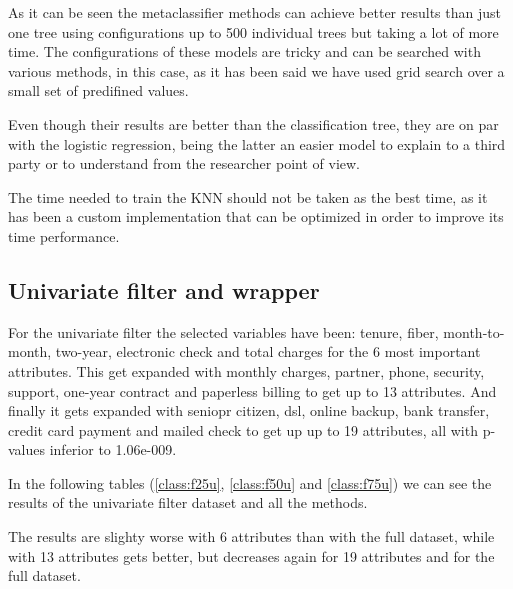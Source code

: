 \documentclass[a4paper,11pt]{article}
\begin{document}
As it can be seen the metaclassifier methods can achieve better results than just one tree using configurations up to 500 individual trees but taking a lot of more time. The configurations of these models are tricky and can be searched with various methods, in this case, as it has been said we have used grid search over a small set of predifined values.

Even though their results are better than the classification tree, they are on par with the logistic regression, being the latter an easier model to explain to a third party or to understand from the researcher point of view.

The time needed to train the KNN should not be taken as the best time, as it has been a custom implementation that can be optimized in order to improve its time performance.

\subsection{Univariate filter and wrapper}

For the univariate filter the selected variables have been: tenure, fiber, month-to-month, two-year, electronic check and total charges for the 6 most important attributes. This get expanded with monthly charges, partner, phone, security, support, one-year contract and paperless billing to get up to 13 attributes. And finally it gets expanded with seniopr citizen, dsl, online backup, bank transfer, credit card payment and mailed check to get up up to 19 attributes, all with p-values inferior to 1.06e-009.

In the following tables (\ref{class:f25u}, \ref{class:f50u} and \ref{class:f75u}) we can see the results of the univariate filter dataset and all the methods.

The results are slighty worse with 6 attributes than with the full dataset, while with 13 attributes gets better, but decreases again for 19 attributes and for the full dataset.
\end{document}
